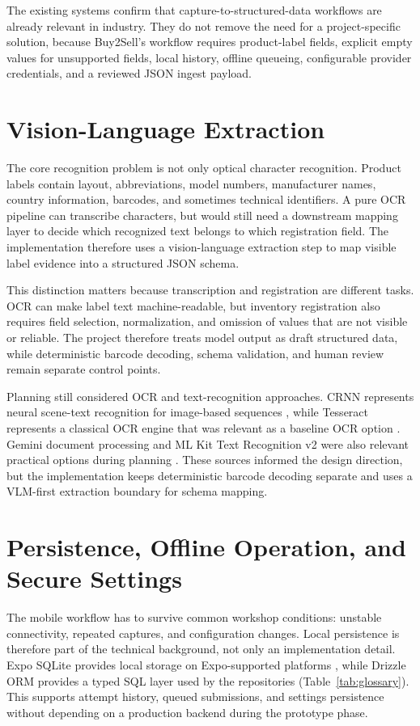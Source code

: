 The existing systems confirm that capture-to-structured-data workflows are already relevant in industry. They do not remove the need for a project-specific solution, because Buy2Sell's workflow requires product-label fields, explicit empty values for unsupported fields, local history, offline queueing, configurable provider credentials, and a reviewed JSON ingest payload.

\section{Vision-Language Extraction}

The core recognition problem is not only optical character recognition. Product labels contain layout, abbreviations, model numbers, manufacturer names, country information, barcodes, and sometimes technical identifiers. A pure OCR pipeline can transcribe characters, but would still need a downstream mapping layer to decide which recognized text belongs to which registration field. The implementation therefore uses a vision-language extraction step to map visible label evidence into a structured JSON schema.

This distinction matters because transcription and registration are different tasks. OCR can make label text machine-readable, but inventory registration also requires field selection, normalization, and omission of values that are not visible or reliable. The project therefore treats model output as draft structured data, while deterministic barcode decoding, schema validation, and human review remain separate control points.

Planning still considered OCR and text-recognition approaches. CRNN represents neural scene-text recognition for image-based sequences \cite{crnn}, while Tesseract represents a classical OCR engine that was relevant as a baseline OCR option \cite{tesseract}. Gemini document processing and ML Kit Text Recognition v2 were also relevant practical options during planning \cite{gemini-doc-processing,mlkit-text-recognition}. These sources informed the design direction, but the implementation keeps deterministic barcode decoding separate and uses a VLM-first extraction boundary for schema mapping.

\section{Persistence, Offline Operation, and Secure Settings}

The mobile workflow has to survive common workshop conditions: unstable connectivity, repeated captures, and configuration changes. Local persistence is therefore part of the technical background, not only an implementation detail. Expo SQLite provides local storage on Expo-supported platforms \cite{expo-sqlite}, while Drizzle ORM provides a typed SQL layer used by the repositories \cite{drizzle} (Table~\ref{tab:glossary}). This supports attempt history, queued submissions, and settings persistence without depending on a production backend during the prototype phase.

